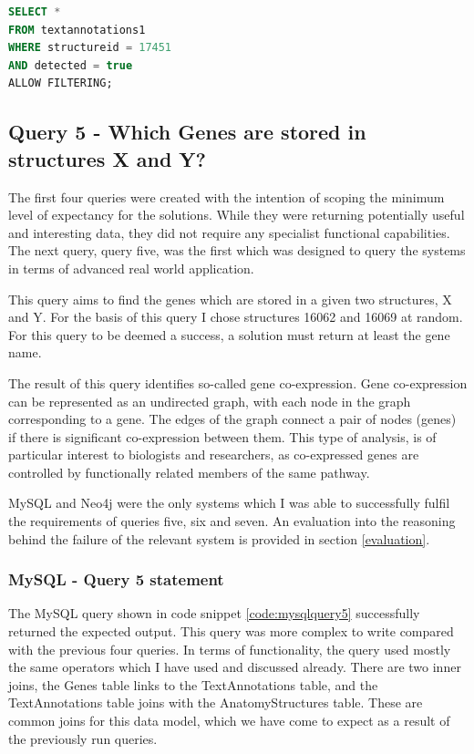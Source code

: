 \begin{lstlisting}[language=SQL, caption=Cassandra query 4 statement. What is expressed in structure X?., label=code:cassquery4]
SELECT *
FROM textannotations1
WHERE structureid = 17451
AND detected = true
ALLOW FILTERING;
\end{lstlisting}

\subsection*{Query 5 - Which Genes are stored in structures X and Y?}\label{query5}
The first four queries were created with the intention of scoping the minimum level of expectancy for the solutions. While they were returning potentially useful and interesting data, they did not require any specialist functional capabilities. The next query, query five, was the first which was designed to query the systems in terms of advanced real world application.

This query aims to find the genes which are stored in a given two structures, X and Y. For the basis of this query I chose structures 16062 and 16069 at random. For this query to be deemed a success, a solution must return at least the gene name.

The result of this query identifies so-called gene co-expression. Gene co-expression can be represented as an undirected graph, with each node in the graph corresponding to a gene. The edges of the graph connect a pair of nodes (genes) if there is significant co-expression between them. This type of analysis, is of particular interest to biologists and researchers, as co-expressed genes are controlled by functionally related members of the same pathway.

MySQL and Neo4j were the only systems which I was able to successfully fulfil the requirements of queries five, six and seven. An evaluation into the reasoning behind the failure of the relevant system is provided in section \ref{evaluation}.

\subsubsection*{MySQL - Query 5 statement}\label{mysqlquery5statement}
The MySQL query shown in code snippet \ref{code:mysqlquery5} successfully returned the expected output. This query was more complex to write compared with the previous four queries. In terms of functionality, the query used mostly the same operators which I have used and discussed already. There are two inner joins, the Genes table links to the TextAnnotations table, and the TextAnnotations table joins with the AnatomyStructures table. These are common joins for this data model, which we have come to expect as a result of the previously run queries.

